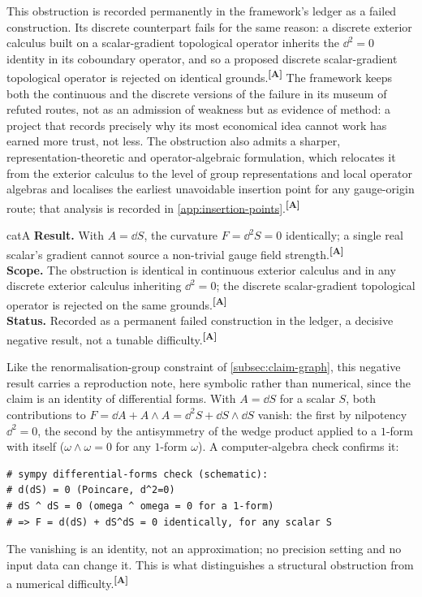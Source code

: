 \documentclass[12pt,a4paper,twoside]{article}
\theoremstyle{plain}
\theoremstyle{definition}
\theoremstyle{remark}
\newcommand{\catmark}[1]{\textsuperscript{\textsf{\textbf{[#1]}}}}
\begin{document}
This obstruction is recorded permanently in the framework's ledger as a failed construction. Its discrete counterpart fails for the same reason: a discrete exterior calculus built on a scalar-gradient topological operator inherits the $\dd^2 = 0$ identity in its coboundary operator, and so a proposed discrete scalar-gradient topological operator is rejected on identical grounds.\catmark{A} The framework keeps both the continuous and the discrete versions of the failure in its museum of refuted routes, not as an admission of weakness but as evidence of method: a project that records precisely why its most economical idea cannot work has earned more trust, not less. The obstruction also admits a sharper, representation-theoretic and operator-algebraic formulation, which relocates it from the exterior calculus to the level of group representations and local operator algebras and localises the earliest unavoidable insertion point for any gauge-origin route; that analysis is recorded in \cref{app:insertion-points}.\catmark{A}

\begin{evidencebox}[The $d^2 = 0$ Obstruction]{catA}
\textbf{Result.} With $A = \dd S$, the curvature $F = \dd^2 S = 0$ identically; a single real scalar's gradient cannot source a non-trivial gauge field
strength.\catmark{A}\\[0.3em]
\textbf{Scope.} The obstruction is identical in continuous exterior calculus and in any discrete exterior calculus inheriting $\dd^2 = 0$; the discrete scalar-gradient topological operator is rejected on the same
grounds.\catmark{A}\\[0.3em]
\textbf{Status.} Recorded as a permanent failed construction in the ledger, a decisive negative result, not a tunable difficulty.\catmark{A}
\end{evidencebox}

\noindent Like the renormalisation-group constraint of \cref{subsec:claim-graph}, this negative result carries a reproduction note, here symbolic rather than numerical, since the claim is an identity of differential forms. With $A=\dd S$ for a scalar $S$, both contributions to $F = \dd A + A\wedge A = \dd^2 S + \dd S \wedge \dd S$ vanish: the first by nilpotency $\dd^2=0$, the second by the antisymmetry of the wedge product applied to a $1$-form with itself ($\omega\wedge\omega=0$ for any $1$-form $\omega$). A computer-algebra check confirms it:
\begin{verbatim}
# sympy differential-forms check (schematic):
# d(dS) = 0 (Poincare, d^2=0)
# dS ^ dS = 0 (omega ^ omega = 0 for a 1-form)
# => F = d(dS) + dS^dS = 0 identically, for any scalar S
\end{verbatim}
The vanishing is an identity, not an approximation; no precision setting and no input data can change it. This is what distinguishes a structural obstruction from a numerical difficulty.\catmark{A}
\end{document}
